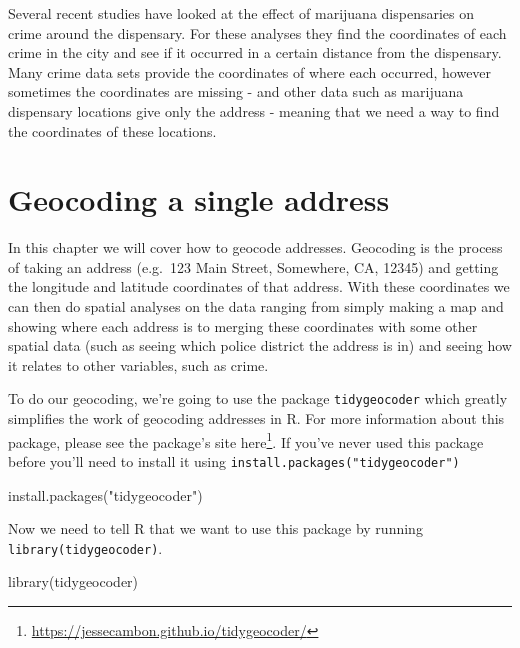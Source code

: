 \documentclass[
]{krantz}
\makeatletter
\newenvironment{Shaded}{\begin{snugshade}}{\end{snugshade}}
\newcommand{\FunctionTok}[1]{\textcolor[rgb]{0,0,0}{#1}}
\newcommand{\NormalTok}[1]{#1}
\newcommand{\StringTok}[1]{\textcolor[rgb]{0.5,0.5,0.5}{#1}}
\renewcommand{\href}[2]{#2\footnote{\url{#1}}}
\newenvironment{kframe}{%
\medskip{}
\setlength{\fboxsep}{.8em}
 \def\at@end@of@kframe{}%
 \ifinner\ifhmode%
  \def\at@end@of@kframe{\end{minipage}}%
  \begin{minipage}{\columnwidth}%
 \fi\fi%
 \def\FrameCommand##1{\hskip\@totalleftmargin \hskip-\fboxsep
 \colorbox{shadecolor}{##1}\hskip-\fboxsep
     \hskip-\linewidth \hskip-\@totalleftmargin \hskip\columnwidth}%
 \MakeFramed {\advance\hsize-\width
   \@totalleftmargin\z@ \linewidth\hsize
   \@setminipage}}%
 {\par\unskip\endMakeFramed%
 \at@end@of@kframe}
\renewenvironment{Shaded}{\begin{kframe}}{\end{kframe}}
\makeatother
\begin{document}
Several recent studies have looked at the effect of marijuana dispensaries on crime around the dispensary. For these analyses they find the coordinates of each crime in the city and see if it occurred in a certain distance from the dispensary. Many crime data sets provide the coordinates of where each occurred, however sometimes the coordinates are missing - and other data such as marijuana dispensary locations give only the address - meaning that we need a way to find the coordinates of these locations.

\hypertarget{geocoding-a-single-address}{%
\section{Geocoding a single address}\label{geocoding-a-single-address}}

In this chapter we will cover how to geocode addresses. Geocoding is the process of taking an address (e.g.~123 Main Street, Somewhere, CA, 12345) and getting the longitude and latitude coordinates of that address. With these coordinates we can then do spatial analyses on the data ranging from simply making a map and showing where each address is to merging these coordinates with some other spatial data (such as seeing which police district the address is in) and seeing how it relates to other variables, such as crime.

To do our geocoding, we're going to use the package \texttt{tidygeocoder} which greatly simplifies the work of geocoding addresses in R. For more information about this package, please see the package's site \href{https://jessecambon.github.io/tidygeocoder/}{here}. If you've never used this package before you'll need to install it using \texttt{install.packages("tidygeocoder")}

\begin{Shaded}
\begin{Highlighting}[]
\FunctionTok{install.packages}\NormalTok{(}\StringTok{"tidygeocoder"}\NormalTok{)}
\end{Highlighting}
\end{Shaded}

Now we need to tell R that we want to use this package by running \texttt{library(tidygeocoder)}.

\begin{Shaded}
\begin{Highlighting}[]
\FunctionTok{library}\NormalTok{(tidygeocoder)}
\end{Highlighting}
\end{Shaded}
\end{document}
